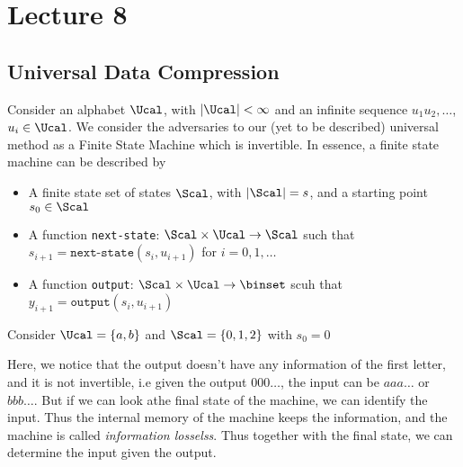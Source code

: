 \chapter{Lecture 8}
\section{Universal Data Compression}
Consider an alphabet $\Ucal$, with $|\Ucal| < \infty$ and an infinite sequence $u_1 u_2, \dots$, $u_i \in \Ucal$. We consider the adversaries to our (yet to be described) universal method as a Finite State Machine which is invertible. In essence, a finite state machine can be described by
\begin{itemize}
    \item A finite state set of states $\Scal$, with $|\Scal| = s$, and a starting point $s_0 \in \Scal$
    \item A function \texttt{next-state}: $\Scal \times \Ucal \to \Scal$ such that $s_{i+1} = \texttt{next-state}(s_i, u_{i+1})$ for $i=0,1,\dots$
    \item A function \texttt{output}: $\Scal \times \Ucal \to \binset$ scuh that $y_{i+1} = \texttt{output}(s_i, u_{i+1})$
\end{itemize}
\begin{eg}
Consider $\Ucal = \{a,b\}$ and $\Scal = \{0,1,2\}$ with $s_0 = 0$
\begin{figure}[H]
\centering
\end{figure}
\noindent Here, we notice that the output doesn't have any information of the first letter, and it is not invertible, i.e given the output $000\dots$, the input can be $aaa\dots$ or $bbb\dots$. But if we can look athe final state of the machine, we can identify the input. Thus the internal memory of the machine keeps the information, and the machine is called \textit{information losselss}. Thus together with the final state, we can determine the input given the output.
\end{eg}
